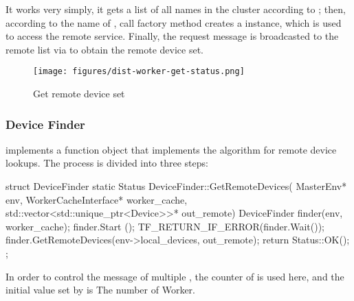 \begin{content}
It works very simply, it gets a list of all  names in the cluster according to ; then, according to the name of , call  factory method creates a  instance, which is used to access the remote  service. Finally, the  request message is broadcasted to the remote  list via  to obtain the remote device set.

\begin{figure}[H]
\centering
\texttt{[image: figures/dist-worker-get-status.png]}
\caption{Get remote device set}
 \label{fig:dist-worker-get-status}
\end{figure}

\subsubsection{Device Finder}

 implements a function object that implements the algorithm for remote device lookups. The process is divided into three steps:

\begin{enum}
\end{enum}

\begin{leftbar}
\begin{c++}
struct DeviceFinder {
  static Status DeviceFinder::GetRemoteDevices(
      MasterEnv* env,
      WorkerCacheInterface* worker_cache,
      std::vector<std::unique_ptr<Device>>* out_remote) {
    DeviceFinder finder(env, worker_cache);
    finder.Start ();
    TF_RETURN_IF_ERROR(finder.Wait());
    finder.GetRemoteDevices(env->local_devices, out_remote);
    return Status::OK();
  }
};
\end{c++}
\end{leftbar}

In order to control the  message of multiple , the counter of  is used here, and the initial value set by  is \code The number of {Worker}.


\end{content}
